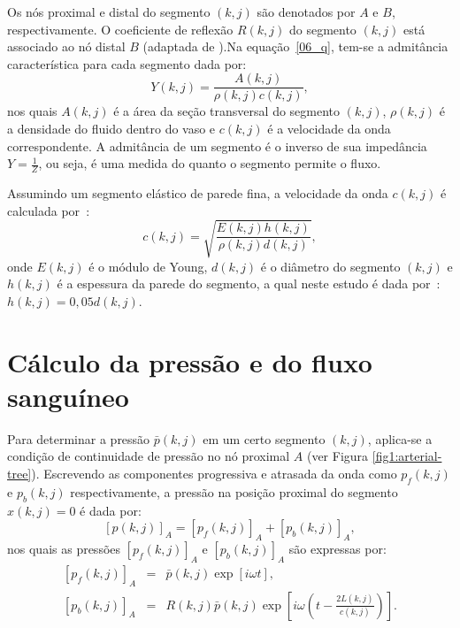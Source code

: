 \documentclass[
        english,			
        brazil			        %
        ,<...>]{abntbibufjf}
\begin{document}
Os nós proximal e distal do segmento $(k,j)$ são denotados por $A$ e $B$, respectivamente. O coeficiente de reflexão $R(k,j)$ do segmento $(k,j)$ está associado ao nó distal $B$ (adaptada de \cite{Duan}).Na equação~\eqref{06_q}, tem-se a admitância característica para cada segmento dada por:
\begin{equation}
Y(k,j) = \frac{A(k,j)}{\rho(k,j)c(k,j)},
\label{eq:admitancia}
\end{equation}
nos quais $A(k,j)$ é a área da seção transversal do segmento $(k,j)$, $\rho(k,j)$ é a densidade do fluido dentro do vaso e $c(k,j)$ é a velocidade da onda correspondente. A admitância de um segmento é o inverso de sua impedância $Y = \frac{1}{Z}$, ou seja, é uma medida do quanto o segmento permite o fluxo.

Assumindo um segmento elástico de parede fina, a velocidade da onda $c(k,j)$ é calculada
por~\cite{Fung}:
\begin{equation}
c(k,j) = \sqrt{\frac{E(k,j) h(k,j)}{\rho(k,j) d(k,j)}},\label{eq:velocidade}
\end{equation}
onde $E(k,j)$ é o módulo de Young, $d(k,j)$ é o diâmetro do segmento $(k,j)$ e $h(k,j)$ é a espessura da parede do segmento, a qual neste estudo é dada por~\cite{Duan}: $h(k,j) = 0,05 d(k,j)$.

\section{Cálculo da pressão e do fluxo sanguíneo}\label{sec:pressao-fluxo}
Para determinar a pressão $\bar{p} (k,j)$ em um certo segmento $(k,j)$, aplica-se a condição de continuidade de pressão no nó proximal $A$ (ver Figura \ref{fig1:arterial-tree}). Escrevendo as componentes progressiva e atrasada da onda como $p_f (k,j)$ e $p_b (k,j)$ respectivamente, a pressão na posição proximal do segmento  $x(k,j) = 0$ é dada por:
\begin{equation}
\left[ p (k,j) \right]_A = \left[ p_f (k,j) \right]_A + \left[ p_b (k,j)\right]_A,
\label{09_p}
\end{equation}
nos quais as pressões $\left[ p_f(k,j) \right]_A$ e $\left[ p_b(k,j) \right]_A$ são expressas por:
\begin{eqnarray}
\left[ p_f(k,j) \right]_A &=& \bar{p}(k,j)\exp\left[ i\omega t\right],
\label{10_p_f}\\
\left[ p_b (k,j) \right]_A &=& R(k,j)\bar{p}(k,j)\exp\left[i\omega \left(t - \frac{2L(k,j)}{c(k,j)}\right) \right].
\label{11_p_b}
\end{eqnarray}
\end{document}
